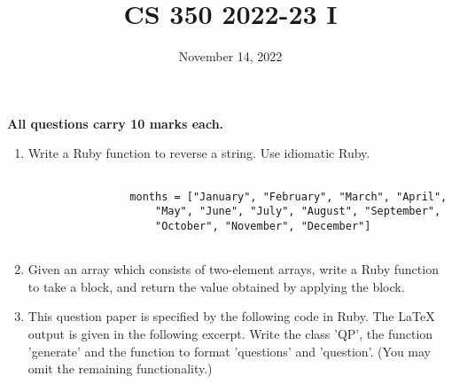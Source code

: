 \documentclass[11pt]{article}
\begin{document}
\title{CS 350 2022-23 I}
\date{November 14, 2022}
\maketitle
\textbf{All questions carry 10 marks each.}
\begin{enumerate}
\item
Write a Ruby function to reverse a string. Use idiomatic Ruby.
\begin{verbatim}

                months = ["January", "February", "March", "April", 
                    "May", "June", "July", "August", "September", 
                    "October", "November", "December"]
                
\end{verbatim}
\item
Given an array which consists of two-element arrays, write a Ruby function to take a block, 
                and return the value obtained by applying the block.
\item
This question paper is specified by the following code in Ruby. The LaTeX output is given 
                in the following excerpt. Write the class 'QP', the function 'generate' and the function to 
                format 'questions' and 'question'. (You may omit the remaining functionality.)
\end{enumerate}
\end{document}
